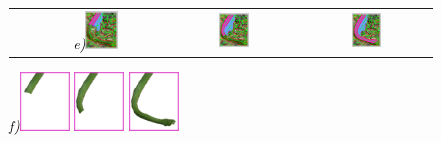 \begin{figure}[p]
\begin{tabular}{cccc}
&
{\footnotesize\textit{\textcolor{black}{e)}}}\includegraphics[width=0.2465\textwidth]{figs/snake_t5.pdf}&
\includegraphics[width=0.2465\textwidth]{figs/snake_t6.pdf}&
\includegraphics[width=0.2465\textwidth]{figs/snake_t4.pdf}\\
\end{tabular}
{\footnotesize\textit{\textcolor{black}{f)}}}\includegraphics[width=0.118\textwidth]{figs/snake_t1.png}
\includegraphics[width=0.118\textwidth]{figs/snake_t2.png}
\includegraphics[width=0.118\textwidth]{figs/snake_t3.png}

\end{figure}
